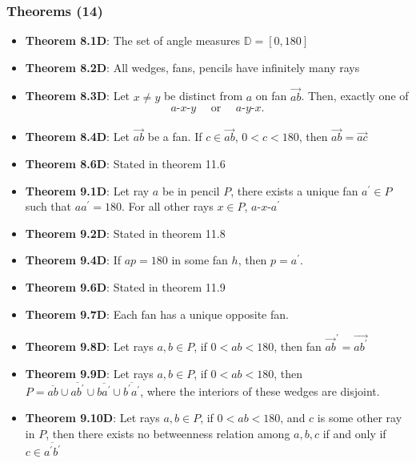 \documentclass{report}
\begin{document}
    \subsubsection{Theorems (14)}
    \begin{itemize}
        \item \textbf{Theorem 8.1D}: The set of angle measures $\mathbb{D} = [0,180]$
        \item \textbf{Theorem 8.2D}: All wedges, fans, pencils have infinitely many rays
        \item \textbf{Theorem 8.3D}: Let $x\ne y$ be distinct from $a$ on fan $\overrightarrow{ab}$. Then, exactly one of 
            \begin{align*}
                a\text{-}x\text{-}y \quad \text{ or } \quad a\text{-}y\text{-}x
            .\end{align*}
        \item \textbf{Theorem 8.4D}: Let $\overrightarrow{ab}$ be a fan. If $c \in \overrightarrow{ab}$, $0 < c < 180$, then $\overrightarrow{ab} = \overrightarrow{ac}$
        \item \textbf{Theorem 8.6D}: Stated in theorem 11.6
        \item \textbf{Theorem 9.1D}: Let ray $a$ be in pencil $P$, there exists a unique fan $a^{\prime} \in P$ such that $aa^{\prime} = 180$. For all other rays $x\in P$, $ a\text{-}x\text{-}a^{\prime} $
        \item \textbf{Theorem 9.2D}: Stated in theorem 11.8
        \item \textbf{Theorem 9.4D}: If $ap = 180$ in some fan $h$, then $p = a^{\prime}$.
        \item \textbf{Theorem 9.6D}: Stated in theorem 11.9
        \item \textbf{Theorem 9.7D}: Each fan has a unique opposite fan.
        \item \textbf{Theorem 9.8D}: Let rays $a,b \in P$, if $0 < ab < 180$, then fan $\overrightarrow{ab}^{\prime} = \overrightarrow{ab^{\prime}} $
        \item \textbf{Theorem 9.9D}: Let rays $a,b \in P$, if $0 < ab < 180$, then $P = \overline{ab} \cup \overline{ab^{\prime}} \cup \overline{ba^{\prime}} \cup \overline{b^{\prime}a^{\prime}}$, where the interiors of these wedges are disjoint.
        \item \textbf{Theorem 9.10D}: Let rays $a,b \in P$, if $0 < ab < 180$, and $c$ is some other ray in $P$, then there exists no betweenness relation among $a,b,c$ if and only if $c \in \overline{a^{\prime}b^{\prime}} $
    \end{itemize}
\end{document}
